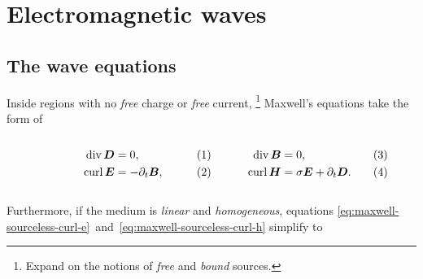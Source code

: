 \documentclass[11pt,a4paper,twoside,openany]{report}
\begin{document}
    \section{Electromagnetic waves}
    \label{sec:electromagnetic-waves}
        
        \subsection{The wave equations}
            Inside regions with no \emph{free} charge or \emph{free} current,%
                \footnote{Expand on the notions of \emph{free} and \emph{bound} sources.}
            Maxwell's equations take the form of\\
            \begin{subequations}
                \label{eq:maxwell-sourceless}
                \noindent\centering
                \begin{minipage}{0.45\textwidth}
                    \begin{align}
                        \label{eq:maxwell-sourceless-div-d}
                        \Div \vec D &= 0,
                    \\
                        \label{eq:maxwell-sourceless-curl-e}
                        \Curl \vec E &= -\partial_t\vec B,
                    \end{align}
                \end{minipage}
                \hfill
                \begin{minipage}{0.45\textwidth}
                    \begin{align}
                        \label{eq:maxwell-sourceless-div-b}
                        \Div\vec B &= 0,
                    \\
                        \label{eq:maxwell-sourceless-curl-h}
                        \Curl\vec H &= \sigma\vec E + \partial_t\vec D.
                    \end{align}
                \end{minipage}\bigskip
            \end{subequations}\\
            Furthermore, if the medium is \emph{linear} and \emph{homogeneous}, equations \eqref{eq:maxwell-sourceless-curl-e}~and~\eqref{eq:maxwell-sourceless-curl-h} simplify to\\
\end{document}
